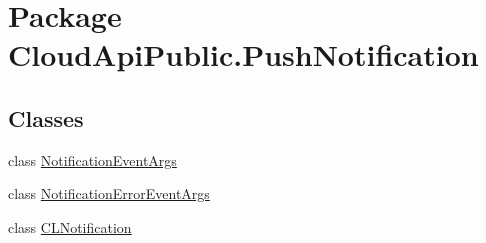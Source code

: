 \hypertarget{namespace_cloud_api_public_1_1_push_notification}{\section{Package Cloud\-Api\-Public.\-Push\-Notification}
\label{namespace_cloud_api_public_1_1_push_notification}
}
\subsection*{Classes}
\begin{DoxyCompactItemize}
\item 
class \hyperlink{class_cloud_api_public_1_1_push_notification_1_1_notification_event_args}{Notification\-Event\-Args}
\item 
class \hyperlink{class_cloud_api_public_1_1_push_notification_1_1_notification_error_event_args}{Notification\-Error\-Event\-Args}
\item 
class \hyperlink{class_cloud_api_public_1_1_push_notification_1_1_c_l_notification}{C\-L\-Notification}
\begin{DoxyCompactList}\small\item\em \end{DoxyCompactList}\end{DoxyCompactItemize}
